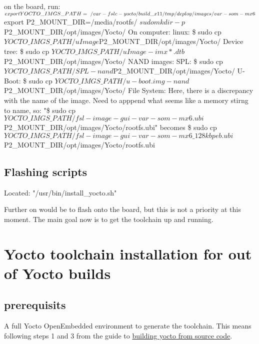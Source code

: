 \documentclass[10pt]{article}
\begin{document}
        on the board, run:
            $ export YOCTO\_IMGS\_PATH=~/var-fslc-yocto/build\_x11/tmp/deploy/images/var-som-mx6\\
            $ export P2\_MOUNT\_DIR=/media/rootfs/
            $ sudo mkdir -p ${P2\_MOUNT\_DIR}/opt/images/Yocto/
        On computer:
            linux:
                \$ sudo cp ${YOCTO\_IMGS\_PATH}/uImage ${P2\_MOUNT\_DIR}/opt/images/Yocto/
            Device tree:
                \$ sudo cp ${YOCTO\_IMGS\_PATH}/uImage-imx*.dtb ${P2\_MOUNT\_DIR}/opt/images/Yocto/
            NAND images:
                SPL:
                    \$ sudo cp ${YOCTO\_IMGS\_PATH}/SPL-nand ${P2\_MOUNT\_DIR}/opt/images/Yocto/
                U-Boot:
                    \$ sudo cp ${YOCTO\_IMGS\_PATH}/u-boot.img-nand ${P2\_MOUNT\_DIR}/opt/images/Yocto/
                File System: Here, there is a discrepancy with the name of the image. Need to apppend what seems like a memory stirng to name, so:
                    "\$ sudo cp ${YOCTO\_IMGS\_PATH}/fsl-image-gui-var-som-mx6.ubi ${P2\_MOUNT\_DIR}/opt/images/Yocto/rootfs.ubi" becomes
                    \$ sudo cp ${YOCTO\_IMGS\_PATH}/fsl-image-gui-var-som-mx6\_128kbpeb.ubi ${P2\_MOUNT\_DIR}/opt/images/Yocto/rootfs.ubi


\subsection{Flashing scripts}
Located: "/usr/bin/install\_yocto.sh"

Further on would be to flash onto the board, but this is not a priority at this moment. The main goal now is to get the toolchain up and running.


\section{Yocto toolchain installation for out of Yocto builds}
\subsection{ prerequisits }
    A full Yocto OpenEmbedded environment to generate the toolchain. This means following steps 1 and 3 from the guide to
    \href{http://variwiki.com/index.php?title=Yocto\_Build\_Release&release=RELEASE\_SUMO\_V1.1\_VAR-SOM-MX6}{building yocto from source code}.
\end{document}
